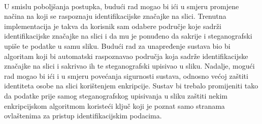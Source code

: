 \documentclass[times, utf8, seminar, numeric]{fer}
\begin{document}
\paragraph{}
U smislu poboljšanja postupka, budući rad mogao bi ići u smjeru promjene načina na koji se raspoznaju identifikacijske značajke na slici. Trenutna implementacija je takva da korisnik sam odabere područje koje sadrži identifikacijske značajke na slici i da mu je ponuđeno da sakrije i steganografski upiše te podatke u samu sliku. Budući rad za unapređenje sustava bio bi algoritam koji bi automatski raspoznavao područja koja sadrže identifikacijske značajke na slici i sakrivao ih te steganografski upisivao u sliku. Nadalje, mogući rad mogao bi ići i u smjeru povećanja sigurnosti sustava, odnosno većoj zaštiti identiteta osobe na slici korištenjem enkripcije. Sustav bi trebalo promijeniti tako da podatke prije samog steganografskog upisivanja u sliku zaštiti nekim enkripcijskom algoritmom koristeći ključ koji je poznat samo stranama ovlaštenima za pristup identifikacijskim podacima.



\end{document}
